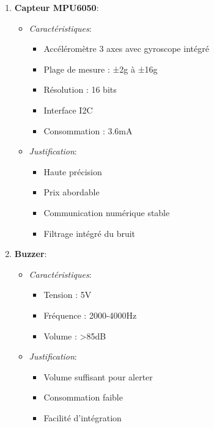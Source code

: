 \documentclass[12pt,a4paper]{article}
\begin{document}
\begin{enumerate}
\item \textbf{Capteur MPU6050}:
\begin{itemize}
\item \textit{Caractéristiques}:
  \begin{itemize}
  \item Accéléromètre 3 axes avec gyroscope intégré
  \item Plage de mesure : ±2g à ±16g
  \item Résolution : 16 bits
  \item Interface I2C
  \item Consommation : 3.6mA
  \end{itemize}
\item \textit{Justification}:
  \begin{itemize}
  \item Haute précision
  \item Prix abordable
  \item Communication numérique stable
  \item Filtrage intégré du bruit
  \end{itemize}
\end{itemize}

\item \textbf{Buzzer}:
\begin{itemize}
\item \textit{Caractéristiques}:
  \begin{itemize}
  \item Tension : 5V
  \item Fréquence : 2000-4000Hz
  \item Volume : >85dB
  \end{itemize}
\item \textit{Justification}:
  \begin{itemize}
  \item Volume suffisant pour alerter
  \item Consommation faible
  \item Facilité d'intégration
  \end{itemize}
\end{itemize}


\end{enumerate}
\end{document}
